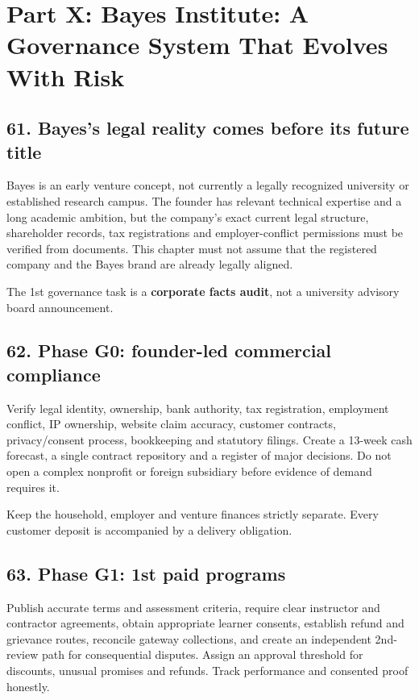 \section*{Part X: Bayes Institute: A Governance System That Evolves With Risk}

\subsection{61. Bayes's legal reality comes before its future title}

Bayes is an early venture concept, not currently a legally recognized university or established research campus. The founder has relevant technical expertise and a long academic ambition, but the company's exact current legal structure, shareholder records, tax registrations and employer-conflict permissions must be verified from documents. This chapter must not assume that the registered company and the Bayes brand are already legally aligned.

The 1st governance task is a \textbf{corporate facts audit}, not a university advisory board announcement.

\subsection{62. Phase G0: founder-led commercial compliance}

Verify legal identity, ownership, bank authority, tax registration, employment conflict, IP ownership, website claim accuracy, customer contracts, privacy/consent process, bookkeeping and statutory filings. Create a 13-week cash forecast, a single contract repository and a register of major decisions. Do not open a complex nonprofit or foreign subsidiary before evidence of demand requires it.

Keep the household, employer and venture finances strictly separate. Every customer deposit is accompanied by a delivery obligation.

\subsection{63. Phase G1: 1st paid programs}

Publish accurate terms and assessment criteria, require clear instructor and contractor agreements, obtain appropriate learner consents, establish refund and grievance routes, reconcile gateway collections, and create an independent 2nd-review path for consequential disputes. Assign an approval threshold for discounts, unusual promises and refunds. Track performance and consented proof honestly.

